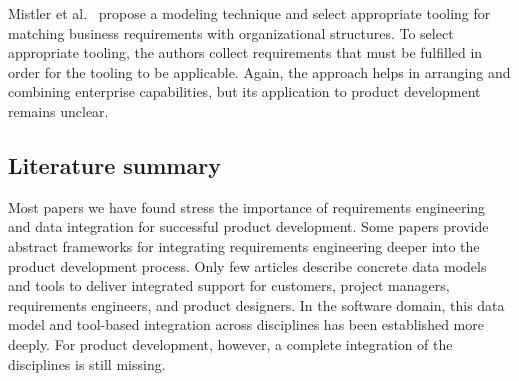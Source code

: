     Mistler et al.~\cite{9447081} propose a modeling technique and select appropriate tooling for matching business requirements with organizational structures.
    To select appropriate tooling, the authors collect requirements that must be fulfilled in order for the tooling to be applicable.
    Again, the approach helps in arranging and combining enterprise capabilities, but its application to product development remains unclear.

    \subsection*{Literature summary}
    Most papers we have found stress the importance of requirements engineering and data integration for successful product development.
    Some papers provide abstract frameworks for integrating requirements engineering deeper into the product development process.
    Only few articles describe concrete data models and tools to deliver  integrated support for customers, project managers, requirements engineers, and product designers.
    In the software domain, this data model and tool-based integration across disciplines has been established more deeply.
    For product development, however, a complete integration of the disciplines is still missing.